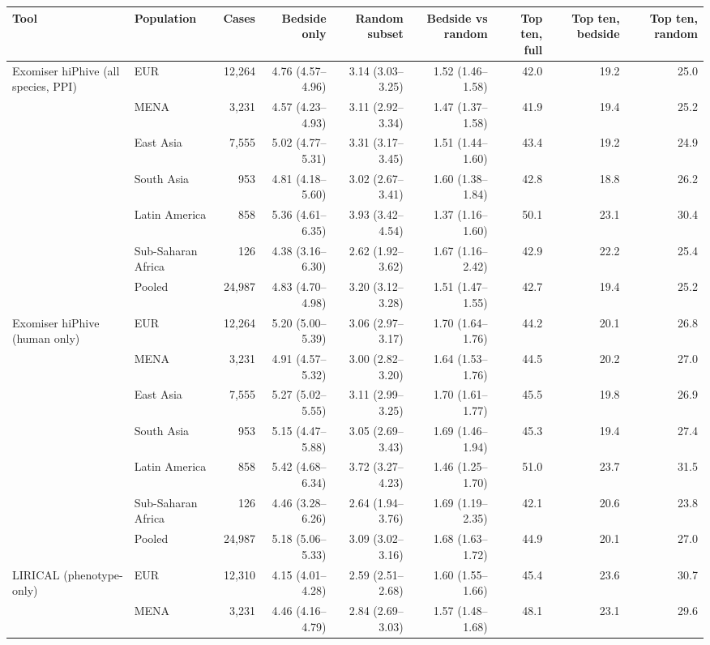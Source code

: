 \begin{tabular}{llrrrrrrr}
\toprule
Tool & Population & Cases & Bedside only & Random subset & Bedside vs random & Top ten, full & Top ten, bedside & Top ten, random \\
\midrule
Exomiser hiPhive (all species, PPI) & EUR & 12,264 & 4.76 (4.57--4.96) & 3.14 (3.03--3.25) & 1.52 (1.46--1.58) & 42.0 & 19.2 & 25.0 \\
 & MENA & 3,231 & 4.57 (4.23--4.93) & 3.11 (2.92--3.34) & 1.47 (1.37--1.58) & 41.9 & 19.4 & 25.2 \\
 & East Asia & 7,555 & 5.02 (4.77--5.31) & 3.31 (3.17--3.45) & 1.51 (1.44--1.60) & 43.4 & 19.2 & 24.9 \\
 & South Asia & 953 & 4.81 (4.18--5.60) & 3.02 (2.67--3.41) & 1.60 (1.38--1.84) & 42.8 & 18.8 & 26.2 \\
 & Latin America & 858 & 5.36 (4.61--6.35) & 3.93 (3.42--4.54) & 1.37 (1.16--1.60) & 50.1 & 23.1 & 30.4 \\
 & Sub-Saharan Africa & 126 & 4.38 (3.16--6.30) & 2.62 (1.92--3.62) & 1.67 (1.16--2.42) & 42.9 & 22.2 & 25.4 \\
 & Pooled & 24,987 & 4.83 (4.70--4.98) & 3.20 (3.12--3.28) & 1.51 (1.47--1.55) & 42.7 & 19.4 & 25.2 \\
\midrule
Exomiser hiPhive (human only) & EUR & 12,264 & 5.20 (5.00--5.39) & 3.06 (2.97--3.17) & 1.70 (1.64--1.76) & 44.2 & 20.1 & 26.8 \\
 & MENA & 3,231 & 4.91 (4.57--5.32) & 3.00 (2.82--3.20) & 1.64 (1.53--1.76) & 44.5 & 20.2 & 27.0 \\
 & East Asia & 7,555 & 5.27 (5.02--5.55) & 3.11 (2.99--3.25) & 1.70 (1.61--1.77) & 45.5 & 19.8 & 26.9 \\
 & South Asia & 953 & 5.15 (4.47--5.88) & 3.05 (2.69--3.43) & 1.69 (1.46--1.94) & 45.3 & 19.4 & 27.4 \\
 & Latin America & 858 & 5.42 (4.68--6.34) & 3.72 (3.27--4.23) & 1.46 (1.25--1.70) & 51.0 & 23.7 & 31.5 \\
 & Sub-Saharan Africa & 126 & 4.46 (3.28--6.26) & 2.64 (1.94--3.76) & 1.69 (1.19--2.35) & 42.1 & 20.6 & 23.8 \\
 & Pooled & 24,987 & 5.18 (5.06--5.33) & 3.09 (3.02--3.16) & 1.68 (1.63--1.72) & 44.9 & 20.1 & 27.0 \\
\midrule
LIRICAL (phenotype-only) & EUR & 12,310 & 4.15 (4.01--4.28) & 2.59 (2.51--2.68) & 1.60 (1.55--1.66) & 45.4 & 23.6 & 30.7 \\
 & MENA & 3,231 & 4.46 (4.16--4.79) & 2.84 (2.69--3.03) & 1.57 (1.48--1.68) & 48.1 & 23.1 & 29.6 \\

\end{tabular}
